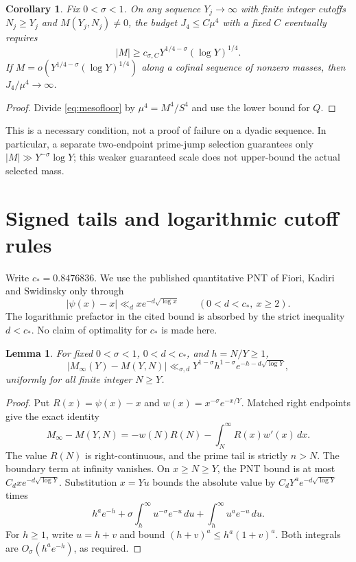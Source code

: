 \documentclass[11pt,a4paper]{article}
\newtheorem{lemma}[theorem]{Lemma}
\newtheorem{corollary}[theorem]{Corollary}
\theoremstyle{definition}
\theoremstyle{remark}
\newcommand{\dd}{\,d}
\begin{document}
\begin{corollary}\label{cor:massfloor}
Fix \(0<\sigma<1\). On any sequence \(Y_j\to\infty\) with finite
integer cutoffs \(N_j\ge Y_j\) and \(M(Y_j,N_j)\ne0\),
the budget \(J_4\le C\mu^4\) with a fixed \(C\) eventually
requires
\[
 |M|\ge c_{\sigma,C}Y^{1/4-\sigma}(\log Y)^{1/4}.
\]
If \(M=o(Y^{1/4-\sigma}(\log Y)^{1/4})\) along a cofinal sequence
of nonzero masses, then \(J_4/\mu^4\to\infty\).
\end{corollary}
\begin{proof}
Divide \eqref{eq:mesofloor} by \(\mu^4=M^4/S^4\) and use the
lower bound for \(Q\).
\end{proof}

This is a necessary condition, not a proof of failure on a dyadic
sequence. In particular, a separate two-endpoint prime-jump
selection guarantees only \(|M|\gg Y^{-\sigma}\log Y\);
this weaker guaranteed scale does not upper-bound the actual
selected mass.

\section{Signed tails and logarithmic cutoff rules}

Write \(c_*=0.8476836\). We use the published quantitative PNT of
Fiori, Kadiri and Swidinsky \cite[Corollary 1.4]{FKS} only through
\[
 |\psi(x)-x|\ll_d x e^{-d\sqrt{\log x}}
 \qquad(0<d<c_*,\ x\ge2).
\]
The logarithmic prefactor in the cited bound is absorbed by the
strict inequality \(d<c_*\). No claim of optimality for \(c_*\)
is made here.

\begin{lemma}\label{lem:signedtail}
For fixed \(0<\sigma<1\), \(0<d<c_*\), and \(h=N/Y\ge1\),
\[
 |M_\infty(Y)-M(Y,N)|
 \ll_{\sigma,d}Y^{1-\sigma}h^{1-\sigma}
                   e^{-h-d\sqrt{\log Y}},
\]
uniformly for all finite integer \(N\ge Y\).
\end{lemma}
\begin{proof}
Put \(R(x)=\psi(x)-x\) and \(w(x)=x^{-\sigma}e^{-x/Y}\).
Matched right endpoints give the exact identity
\[
 M_\infty-M(Y,N)
 =-w(N)R(N)-\int_N^\infty R(x)w'(x)\dd x.
\]
The value \(R(N)\) is right-continuous, and the prime tail is
strictly \(n>N\). The boundary term at infinity vanishes.
On \(x\ge N\ge Y\), the PNT bound is at most
\(C_dx e^{-d\sqrt{\log Y}}\). Substitution \(x=Yu\) bounds the
absolute value by \(C_dY^a e^{-d\sqrt{\log Y}}\) times
\[
 h^ae^{-h}+\sigma\int_h^\infty u^{-\sigma}e^{-u}\dd u
                 +\int_h^\infty u^ae^{-u}\dd u.
\]
For \(h\ge1\), write \(u=h+v\) and bound
\((h+v)^a\le h^a(1+v)^a\). Both integrals are
\(O_\sigma(h^ae^{-h})\), as required.
\end{proof}
\end{document}
